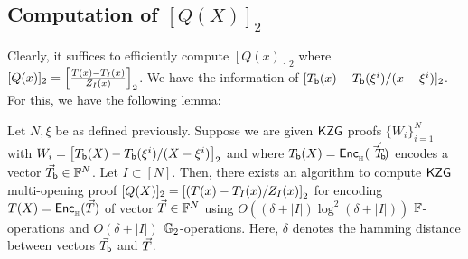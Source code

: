 \subsection{Computation of $[Q(X)]_2$}
Clearly, it suffices to efficiently compute $[Q(x)]_2$ where $[Q(x)]_2=\left[{\frac{T(x)-T_I(x)}{Z_I(x)}}\right]_2$. We have the information of $[T_{\mathsf{b}}({x})-T_{\mathsf{b}}({\xi^i})/(x-\xi^i)]_2$. For this, we have the following lemma:


\begin{lemma}\label{lem:approx-setup}
Let $N,\xi$ be as defined previously. Suppose we are given
$\mathsf{KZG}$ proofs $\{W_i\}_{i=1}^N$ with $W_i=\left[{T_{\mathsf{b}}({X}) - T_{\mathsf{b}}({\xi^i})/(X-\xi^i)}\right]_2$ and where
$T_{\mathsf{b}}({X})=\mathsf{Enc}_{{}_{\mathbb{H}}}(\vec{\vec{T}_{\mathsf{b}}})$ encodes a vector $\vec{T}_{\mathsf{b}}\in \mathbb{F}^N$.
Let $I \subset [N]$.
Then,
there exists an algorithm to compute $\mathsf{KZG}$ multi-opening proof
$[Q(X)]_2=\left[{(T(x) - T_I(x)/Z_I(x)}\right]_2$ for encoding $T(X)=\mathsf{Enc}_{{}_{\mathbb{H}}}(\vec{T})$ of vector $\vec{T}\in \mathbb{F}^N$ using $O((\delta + |I|) \log^2 (\delta + |I|))$ $\mathbb{F}$-operations and $O(\delta + |I|)$ $\mathbb{G}_2$-operations.
Here, $\delta$ denotes the hamming distance
between vectors $\vec{T}_{\mathsf{b}}$ and $\vec{T}$.
\end{lemma}

